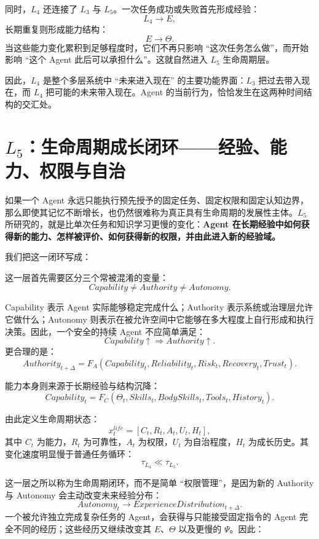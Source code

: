 同时，$L_4$ 还连接了 $L_3$ 与 $L_5$。一次任务成功或失败首先形成经验：
\[
L_4\rightarrow E,
\]
长期重复则形成能力结构：
\[
E\rightarrow\Theta.
\]
当这些能力变化累积到足够程度时，它们不再只影响 ``这次任务怎么做''，而开始影响 ``这个 Agent 此后可以承担什么''。这就自然进入 $L_5$ 生命周期层。

因此，$L_4$ 是整个多层系统中 ``未来进入现在'' 的主要功能界面：$L_3$ 把过去带入现在，而 $L_4$ 把可能的未来带入现在。Agent 的当前行为，恰恰发生在这两种时间结构的交汇处。

\section{$L_5$：生命周期成长闭环——经验、能力、权限与自治}

如果一个 Agent 永远只能执行预先授予的固定任务、固定权限和固定认知边界，那么即使其记忆不断增长，也仍然很难称为真正具有生命周期的发展性主体。$L_5$ 所研究的，就是比单次任务和知识学习更慢的变化：\textbf{Agent 在长期经验中如何获得新的能力、怎样被评价、如何获得新的权限，并由此进入新的经验域。}

我们把这一闭环写成：
\begin{statementbox}
\centering
{}
\end{statementbox}

这一层首先需要区分三个常被混淆的变量：
\[
Capability\neq Authority\neq Autonomy.
\]

Capability 表示 Agent 实际能够稳定完成什么；Authority 表示系统或治理层允许它做什么；Autonomy 则表示在被允许空间中它能够在多大程度上自行形成和执行决策。因此，一个安全的持续 Agent 不应简单满足：
\[
Capability\uparrow
\Rightarrow
Authority\uparrow.
\]
更合理的是：
\[
Authority_{t+\Delta}
=
F_A
\left(
Capability_t,
Reliability_t,
Risk_t,
Recovery_t,
Trust_t
\right).
\]

能力本身则来源于长期经验与结构沉降：
\[
Capability_t
=
F_C
\left(
\Theta_t,
Skills_t,
BodySkills_t,
Tools_t,
History_t
\right).
\]

由此定义生命周期状态：
\[
x^{life}_t
=
\left[
C_t,
R_t,
A_t,
U_t,
H_t
\right],
\]
其中 $C_t$ 为能力，$R_t$ 为可靠性，$A_t$ 为权限，$U_t$ 为自治程度，$H_t$ 为成长历史。其变化速度明显慢于普通任务循环：
\[
\tau_{L_4}
\ll
\tau_{L_5}.
\]

这一层之所以称为生命周期闭环，而不是简单 ``权限管理''，是因为新的 Authority 与 Autonomy 会主动改变未来经验分布：
\[
Autonomy_t
\rightarrow
ExperienceDistribution_{t+\Delta}.
\]
一个被允许独立完成复杂任务的 Agent，会获得与只能接受固定指令的 Agent 完全不同的经历；这些经历又继续改变其 $E$、$\Theta$ 以及更慢的 $\Psi$。因此：
\begin{statementbox}
\centering
{}
\end{statementbox}

